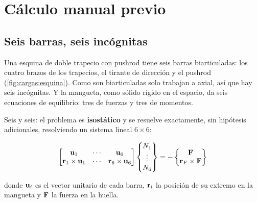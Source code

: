 \section{Cálculo manual previo}
\label{sec:casos_carga:03}

\subsection{Seis barras, seis incógnitas}

Una esquina de doble trapecio con pushrod tiene seis barras biarticuladas: los
cuatro brazos de los trapecios, el tirante de dirección y el pushrod
(\cref{fig:cargas:esquina}). Como son biarticuladas solo trabajan a axial, así
que hay seis incógnitas. Y la mangueta, como sólido rígido en el espacio, da
seis ecuaciones de equilibrio: tres de fuerzas y tres de momentos.

Seis y seis: el problema es \textbf{isostático} y se resuelve exactamente, sin
hipótesis adicionales, resolviendo un sistema lineal $6\times 6$:

\begin{equation}
  \begin{bmatrix} \mathbf{u}_1 & \cdots & \mathbf{u}_6 \\
                  \mathbf{r}_1\times\mathbf{u}_1 & \cdots &
                  \mathbf{r}_6\times\mathbf{u}_6 \end{bmatrix}
  \begin{Bmatrix} N_1 \\ \vdots \\ N_6 \end{Bmatrix}
  = - \begin{Bmatrix} \mathbf{F} \\ \mathbf{r}_F\times\mathbf{F} \end{Bmatrix}
  \label{eq:equilibrio_esquina}
\end{equation}

donde $\mathbf{u}_i$ es el vector unitario de cada barra, $\mathbf{r}_i$ la posición
de su extremo en la mangueta y $\mathbf{F}$ la fuerza en la huella.

